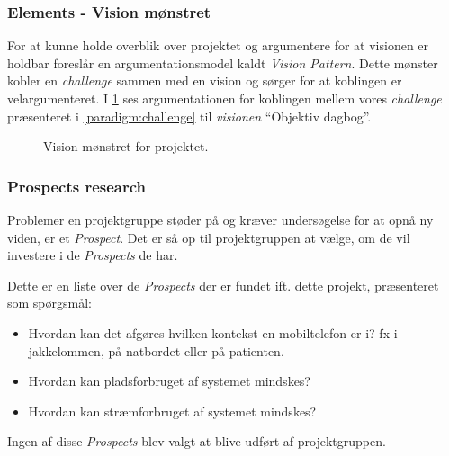 \subsubsection{Elements - Vision mønstret}
For at kunne holde overblik over projektet og argumentere for at visionen er holdbar foreslår \citet[Kapitel 15 - Project]{art:essence} en argumentationsmodel kaldt \emph{Vision Pattern}. 
Dette mønster kobler en \emph{challenge} sammen med en vision og sørger for at koblingen er velargumenteret.
I \cref{fig:visionpattern} ses argumentationen for koblingen mellem vores \textit{challenge} præsenteret i \cref{paradigm:challenge} til \textit{visionen} ``Objektiv dagbog''.

\begin{figure}[h]
	\centering
	\resizebox{\columnwidth}{!}{
		}
	\caption{Vision mønstret for projektet.}
	\label{fig:visionpattern}
\end{figure}

\subsubsection{Prospects research}
Problemer en projektgruppe støder på og kræver undersøgelse for at opnå ny viden, er et \textit{Prospect}.
Det er så op til projektgruppen at vælge, om de vil investere i de \textit{Prospects} de har. \cite[nederst på side 104]{art:essence}

Dette er en liste over de \textit{Prospects} der er fundet ift. dette projekt, præsenteret som spørgsmål:
\begin{itemize}
	\item Hvordan kan det afgøres hvilken kontekst en mobiltelefon er i? fx i jakkelommen, på natbordet eller på patienten.
	\item Hvordan kan pladsforbruget af systemet mindskes?
	\item Hvordan kan stræmforbruget af systemet mindskes?
\end{itemize}
Ingen af disse \textit{Prospects} blev valgt at blive udført af projektgruppen.